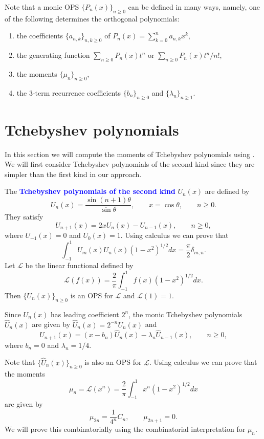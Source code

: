 \documentclass[oneside]{book}
\numberwithin{equation}{section}
\theoremstyle{definition}
\newcommand\LL{\mathcal{L}}
\renewcommand\emph[1]{\textcolor{blue}{\bf #1}}
\begin{document}
Note that a monic OPS \( \{ P_n(x) \}_{n\ge 0} \) can be defined in
many ways, namely, one of the following determines the orthogonal
polynomials:
\begin{enumerate}
\item the coefficients \( \{a_{n,k}\}_{n,k\ge0} \) of \( P_n(x)= \sum_{k=0}^{n} a_{n,k} x^k   \),
\item the generating function \( \sum_{n\ge0}P_n(x)t^n \)
  or \( \sum_{n\ge0}P_n(x)t^n/n! \),
\item the moments \( \{ \mu_n\}_{n\ge 0} \),
\item the 3-term recurrence coefficients \( \{ b_n\}_{n\ge 0} \) and
  \( \{ \lambda_n\}_{n\ge 1} \).
\end{enumerate}

\section{Tchebyshev polynomials}

In this section we will compute the moments of Tchebyshev polynomials
using . We will first consider Tchebyshev polynomials
of the second kind since they are simpler than the first kind in our
approach.



The \emph{Tchebyshev polynomials of the second kind}
\( U_n(x) \) are defined by
\[
  U_n(x) = \frac{\sin(n+1)\theta}{\sin\theta}, \qquad x=\cos\theta,
  \qquad n\ge0.
\]
They satisfy
  \[
    U_{n+1}(x) = 2x U_n(x) - U_{n-1}(x), \qquad n\ge0,
  \]
  where \( U_{-1}(x) = 0 \) and \( U_0(x) = 1 \).
  Using calculus we can prove that
  \[
    \int_{-1}^1 U_m(x)U_n(x) (1-x^2)^{1/2} dx = \frac{\pi}{2}\delta_{m,n}.
  \]
  Let \( \LL \) be the linear functional defined by
  \[
    \LL(f(x)) = \frac{2}{\pi} \int_{-1}^1 f(x) (1-x^2)^{1/2} dx.
  \]
  Then \( \{U_n(x)\}_{n\ge0} \) is an OPS for \( \LL \) and
  \( \LL(1) = 1 \).

  Since \( U_n(x) \) has leading coefficient \( 2^n \), the monic
  Tchebyshev polynomials \( \hat{U}_n(x) \) are given by
  \( \hat{U}_n(x) = 2^{-n}U_n(x) \) and
  \[
    \hat{U}_{n+1}(x) = (x-b_n) \hat{U}_n(x) - \lambda_n \hat{U}_{n-1}(x), \qquad n\ge0,
  \] 
  where \( b_n = 0 \) and \( \lambda_n = 1/4 \).

  Note that \( \{\hat{U}_n(x)\}_{n\ge0} \) is also an OPS for
  \( \LL \). Using calculus we can prove that
  the moments
  \[
    \mu_n= \LL(x^n) = \frac{2}{\pi} \int_{-1}^1 x^n (1-x^2)^{1/2} dx
  \]
  are given by
  \begin{equation}\label{eq:20}
    \mu_{2n} = \frac{1}{4^n} C_n, \qquad \mu_{2n+1} = 0.
  \end{equation}
  We will prove this combinatorially using the combinatorial
  interpretation for \( \mu_n \).
\end{document}
